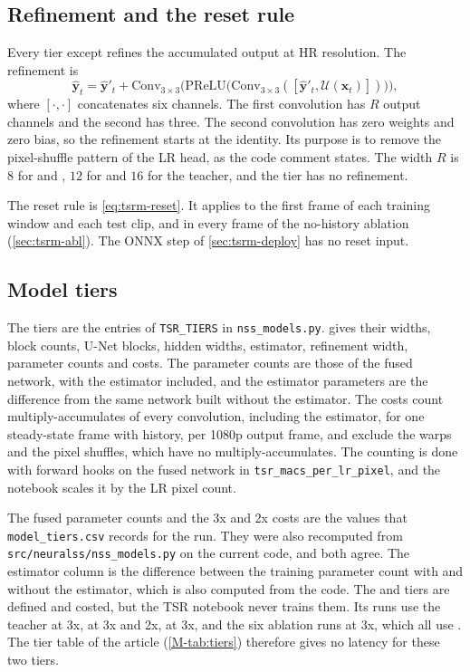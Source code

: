 \subsection{Refinement and the reset rule}\label{sec:tsrm-refine}

Every tier except  refines the accumulated output at HR resolution. The refinement is
\begin{equation}\label{eq:tsrm-refine}
\hat{\mathbf{y}}_t=\hat{\mathbf{y}}'_t+\mathrm{Conv}_{3\times3}\Big(\mathrm{PReLU}\big(\mathrm{Conv}_{3\times3}([\hat{\mathbf{y}}'_t,\mathcal{U}(\mathbf{x}_t)])\big)\Big),
\end{equation}
where $[\cdot,\cdot]$ concatenates six channels. The first convolution has $R$ output channels and the second has three. The second convolution has zero weights and zero bias, so the refinement starts at the identity. Its purpose is to remove the pixel-shuffle pattern of the LR head, as the code comment states. The width $R$ is $8$ for  and , $12$ for  and $16$ for the teacher, and the  tier has no refinement.

The reset rule is \cref{eq:tsrm-reset}. It applies to the first frame of each training window and each test clip, and in every frame of the no-history ablation (\cref{sec:tsrm-abl}). The ONNX step of \cref{sec:tsrm-deploy} has no reset input.

\subsection{Model tiers}\label{sec:tsrm-tiers}

The tiers are the entries of \texttt{TSR\_TIERS} in \texttt{nss\_models.py}.  gives their widths, block counts, U-Net blocks, hidden widths, estimator, refinement width, parameter counts and costs. The parameter counts are those of the fused network, with the estimator included, and the estimator parameters are the difference from the same network built without the estimator. The costs count multiply-accumulates of every convolution, including the estimator, for one steady-state frame with history, per 1080p output frame, and exclude the warps and the pixel shuffles, which have no multiply-accumulates. The counting is done with forward hooks on the fused network in \texttt{tsr\_macs\_per\_lr\_pixel}, and the notebook scales it by the LR pixel count.

The fused parameter counts and the 3x and 2x costs are the values that \texttt{model\_tiers.csv} records for the run. They were also recomputed from \texttt{src/neuralss/nss\_models.py} on the current code, and both agree. The estimator column is the difference between the training parameter count with and without the estimator, which is also computed from the code. The  and  tiers are defined and costed, but the TSR notebook never trains them. Its runs use the teacher at 3x,  at 3x and 2x,  at 3x, and the six ablation runs at 3x, which all use . The tier table of the article (\cref{M-tab:tiers}) therefore gives no latency for these two tiers.

